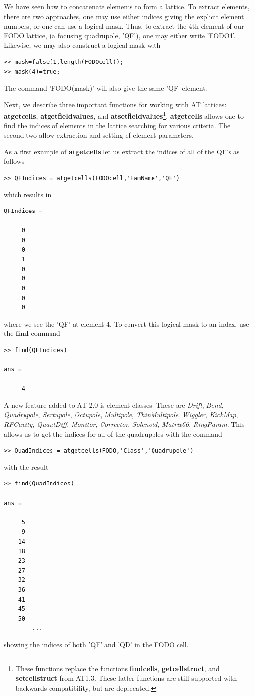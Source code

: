 \documentclass[acus]{article}
\newcommand{\mfun}[1]{{\bf{#1}}}
\newcommand{\class}[1]{{\it{#1}}}
\begin{document}
We have seen how to concatenate elements to form a lattice.  To extract elements, there are two
approaches, one may use either indices giving the explicit element numbers, or one can use a logical 
mask. Thus, to extract the 4th element of our FODO lattice, (a focusing quadrupole, 'QF'), one may
either write 'FODO{4}'. Likewise, we may also construct a logical mask with
\begin{verbatim}
>> mask=false(1,length(FODOcell));
>> mask(4)=true;
\end{verbatim}
The command 'FODO(mask)' will also give the same 'QF' element.

Next, we describe three important functions for working with AT lattices: \mfun{atgetcells},
\mfun{atgetfieldvalues}, and \mfun{atsetfieldvalues}\footnote{These functions replace the functions
\mfun{findcells}, \mfun{getcellstruct}, and \mfun{setcellstruct} from AT1.3.  These latter functions 
are still supported with backwards compatibility, but are deprecated.}.
\mfun{atgetcells} allows one to find the indices of elements in the lattice searching for 
various criteria.  The second two allow extraction and setting of element parameters.



As a first example of \mfun{atgetcells} let us extract the indices of all of the QF's as follows
\begin{verbatim}
>> QFIndices = atgetcells(FODOcell,'FamName','QF')
\end{verbatim}
which results in
\begin{verbatim}
QFIndices =

     0
     0
     0
     1
     0
     0
     0
     0
     0
\end{verbatim}
where we see the 'QF' at element 4.  To convert this logical mask to an index, use the \mfun{find}
command
\begin{verbatim}
>> find(QFIndices)

ans =

     4
\end{verbatim}

A new feature added to AT 2.0 is element classes.  These are \class{Drift}, \class{Bend}, \class{Quadrupole}, \class{Sextupole}, \class{Octupole}, \class{Multipole}, \class{ThinMultipole}, 
\class{Wiggler}, \class{KickMap}, \class{RFCavity}, \class{QuantDiff}, \class{Monitor}, \class{Corrector}, \class{Solenoid}, 
\class{Matrix66}, \class{RingParam}.
This allows us to get the indices for all of the quadrupoles with the command
 \begin{verbatim}
>> QuadIndices = atgetcells(FODO,'Class','Quadrupole')
\end{verbatim}
with the result
\begin{verbatim}
>> find(QuadIndices)

ans =

     5
     9
    14
    18
    23
    27
    32
    36
    41
    45
    50
		...
\end{verbatim}
showing the indices of both 'QF' and 'QD' in the FODO cell.  
\end{document}
